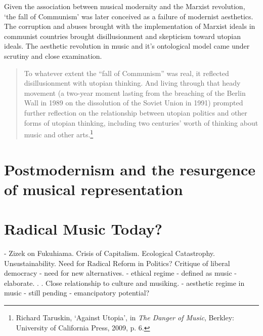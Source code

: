 Given the association between musical modernity and the Marxist revolution, `the fall of Communism' was later conceived as a failure of modernist aesthetics. The corruption and abuses brought with the implementation of Marxist ideals in communist countries brought disillusionment and skepticism toward utopian ideals. The aesthetic revolution in music and it's ontological model came under scrutiny and close examination. 

\begin{quote}
To whatever extent the ``fall of Communism'' was real, it reflected disillusionment with utopian thinking. And living through that heady movement (a two-year moment lasting from the breaching of the Berlin Wall in 1989 on the dissolution of the Soviet Union in 1991) prompted further reflection on the relationship between utopian politics and other forms of utopian thinking, including two centuries' worth of thinking about music and other arts.\footnote{Richard Taruskin, `Against Utopia', in \emph{The Danger of Music}, Berkley: University of California Press, 2009, p. 6.}
\end{quote}


\section{Postmodernism and the resurgence of musical representation}

\section{Radical Music Today?}

- Zizek on Fukuhiama. Crisis of Capitalism. Ecological Catastrophy. Unsustainability. Need for Radical Reform in Politics? Critique of liberal democracy - need for new alternatives.
- ethical regime - defined as music - elaborate. . . Close relationship to culture and musiking.
- aesthetic regime in music - still pending - emancipatory potential?


\label{ch:introduction}